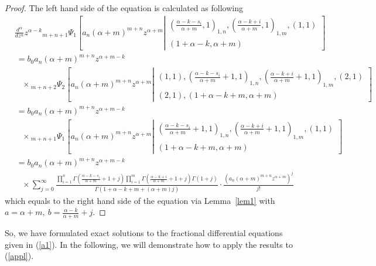 \documentclass[12pt]{article}
\theoremstyle{definition}
\begin{document}
\begin{proof}
   The left hand side of the equation is calculated as following
    \begin{align*}
   &\frac{d^{\alpha}}{dz
^{\alpha}}z^{\alpha-k} {}_{m+n+1}\Psi_1
\left[a_{n}(\alpha+m)^{m+n}z^{\alpha+m}\left|\begin{matrix}(
\frac{\alpha-k-s_i}{\alpha+m} ,1)_{1,n},(\frac{\alpha-k+i}{\alpha+m},1)_{1,m},( 1 , 1 )\\ 
( 1+\alpha-k , \alpha+m ) \end{matrix}\right.\right]\\
&~ =b_0a_n(\alpha+m)^{m+n}z^{\alpha+m-k}\\
&~~~~\times{}_{m+n+2}\Psi_2
\left[a_{n}(\alpha+m)^{m+n}z^{\alpha+m}\left|\begin{matrix}( 1 , 1) , (
\frac{\alpha-k-s_i}{\alpha+m}+1 ,1)_{1,n},(\frac{\alpha-k+i}{\alpha+m}+1,1)_{1,m},  ( 2 , 1 )\\ 
( 2 , 1),( 1+\alpha-k+m , \alpha+m ) \end{matrix}\right.\right]\\
&~ =b_0a_n(\alpha+m)^{m+n}z^{\alpha+m-k}\\
&~~~~\times {}_{m+n+1}\Psi_1
\left[a_{n}(\alpha+m)^{m+n}z^{\alpha+m}\left|\begin{matrix} (
\frac{\alpha-k-s_i}{\alpha+m}+1 ,1)_{1,n},(\frac{\alpha-k+i}{\alpha+m}+1,1)_{1,m},  ( 1 , 1 )\\ ( 1+\alpha-k+m , \alpha+m ) \end{matrix}\right.\right]\\
&~ =b_0a_n(\alpha+m)^{m+n}z^{\alpha+m-k}\\
&~~~~\times\sum \limits_{j=0}^{\infty}\frac{ \prod\limits_{i=1}^{n}\Gamma
\left( \frac{\alpha-k-s_i}{\alpha+m}+1+j\right)  \prod\limits_{i=1}^{m}\Gamma  \left(
\frac{\alpha-k+i}{\alpha+m}+1+j\right) \Gamma(1+j)  }{\Gamma(1+\alpha-k+m+(\alpha+m)j)}\cdot\frac{
\left(a_{n}(\alpha+m)^{m+n}z^{\alpha+m}\right)^{j}}{j!}
\end{align*}
which equals to the right hand side of the equation via Lemma~\ref{lem1} with $a=\alpha+m,~b=\frac{\alpha-k}{\alpha+m}+j$.
\end{proof}
So, we have formulated exact solutions to the fractional differential equations given in (\ref{a1}). In the following, we will demonstrate how to apply the results to (\ref{appl}).
\end{document}
